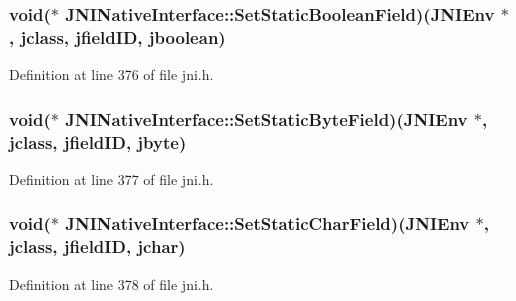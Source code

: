 \hypertarget{struct_j_n_i_native_interface_a69daf184e9a474caf60e42b6b5c258ed}{
\subsubsection[{Set\-Static\-Boolean\-Field}]{\setlength{\rightskip}{0pt plus 5cm}void($\ast$ J\-N\-I\-Native\-Interface\-::\-Set\-Static\-Boolean\-Field)({\bf J\-N\-I\-Env} $\ast$, {\bf jclass}, {\bf jfield\-I\-D}, {\bf jboolean})}}\label{struct_j_n_i_native_interface_a69daf184e9a474caf60e42b6b5c258ed}


Definition at line 376 of file jni.\-h.

\hypertarget{struct_j_n_i_native_interface_a0db8e61768f82a54ce89082f32b82004}{
\subsubsection[{Set\-Static\-Byte\-Field}]{\setlength{\rightskip}{0pt plus 5cm}void($\ast$ J\-N\-I\-Native\-Interface\-::\-Set\-Static\-Byte\-Field)({\bf J\-N\-I\-Env} $\ast$, {\bf jclass}, {\bf jfield\-I\-D}, {\bf jbyte})}}\label{struct_j_n_i_native_interface_a0db8e61768f82a54ce89082f32b82004}


Definition at line 377 of file jni.\-h.

\hypertarget{struct_j_n_i_native_interface_a432af1d450b459fdab1cfc4d9372dc27}{
\subsubsection[{Set\-Static\-Char\-Field}]{\setlength{\rightskip}{0pt plus 5cm}void($\ast$ J\-N\-I\-Native\-Interface\-::\-Set\-Static\-Char\-Field)({\bf J\-N\-I\-Env} $\ast$, {\bf jclass}, {\bf jfield\-I\-D}, {\bf jchar})}}\label{struct_j_n_i_native_interface_a432af1d450b459fdab1cfc4d9372dc27}


Definition at line 378 of file jni.\-h.

